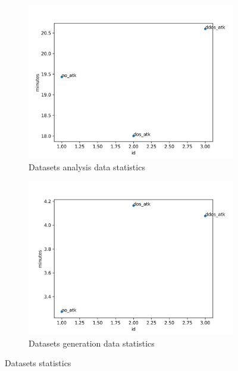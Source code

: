 \begin{figure}[h]
	\begin{subfigure}{0.48\textwidth}
		\includegraphics[width=\textwidth]{imgs/analysis_stat.png}
		\caption{Datasets analysis data statistics} 
		\label{fig:analysis_stats}
	\end{subfigure}
	\hspace*{\fill} %
	\begin{subfigure}{0.48\textwidth}
		\includegraphics[width=\textwidth]{imgs/generation_stat.png}
		\caption{Datasets generation data statistics} 
		\label{fig:generation_stats}
	\end{subfigure}
	\caption{Datasets statistics}
	\label{fig:datasets_statistics}
\end{figure}

